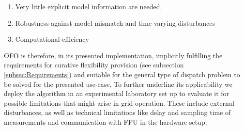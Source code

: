\documentclass[conference,a4paper]{IEEEtran}
\begin{document}
\begin{enumerate}
    \item Very little explicit model information are needed
    \item Robustness against model mismatch and time-varying disturbances
    \item Computational efficiency
\end{enumerate}
OFO is therefore, in its presented implementation, implicitly fulfilling the requirements for curative flexibility provision (see subsection \ref{subsec:Requirements}) and suitable for the general type of dispatch problem to be solved for the presented use-case. To further underline its applicability we deploy the algorithm in an experimental laboratory set up to evaluate it for possible limitations that might arise in grid operation. These include external disturbances, as well as technical limitations like delay and sampling time of measurements and communication with FPU in the hardware setup.
\end{document}
